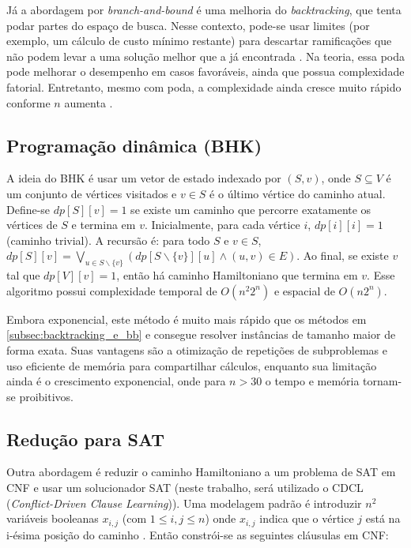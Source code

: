 Já a abordagem por \textit{branch-and-bound} é uma melhoria do \textit{backtracking}, que tenta podar partes do espaço de busca. Nesse contexto, pode-se usar limites (por exemplo, um cálculo de custo mínimo restante) para descartar ramificações que não podem levar a uma solução melhor que a já encontrada \cite{Sergeenko2020}. Na teoria, essa poda pode melhorar o desempenho em casos favoráveis, ainda que possua complexidade fatorial. Entretanto, mesmo com poda, a complexidade ainda cresce muito rápido conforme $n$ aumenta \cite{Sergeenko2020}.


\subsection{Programação dinâmica (BHK) \texorpdfstring{\cite{Held1962,Bellman1962}}{(Held e Karp, 1962; Bellman 1962)}} \label{subsec:programacao_dinamica}

A ideia do BHK é usar um vetor de estado indexado por $(S,v)$, onde $S\subseteq V$ é um conjunto de vértices visitados e $v\in S$ é o último vértice do caminho atual. Define-se $dp[S][v]=1$ se existe um caminho que percorre exatamente os vértices de $S$ e termina em $v$. Inicialmente, para cada vértice $i$, $dp[i][i]=1$ (caminho trivial). A recursão é: para todo $S$ e $v\in S$, $dp[S][v]=\bigvee_{u\in S\backslash\{v\}}(dp[S\backslash\{v\}][u]\land(u,v)\in E)$. Ao final, se existe $v$ tal que $dp[V][v]=1$, então há caminho Hamiltoniano que termina em $v$. Esse algoritmo possui complexidade temporal de $O(n^2 2^n)$ e espacial de $O(n2^n)$.

Embora exponencial, este método é muito mais rápido que os métodos em \ref{subsec:backtracking_e_bb} e consegue resolver instâncias de tamanho maior de forma exata. Suas vantagens são a otimização de repetições de subproblemas e uso eficiente de memória para compartilhar cálculos, enquanto sua limitação ainda é o crescimento exponencial, onde para $n>30$ o tempo e memória tornam-se proibitivos.


\subsection{Redução para SAT}

Outra abordagem é reduzir o caminho Hamiltoniano a um problema de SAT em CNF e usar um solucionador SAT (neste trabalho, será utilizado o CDCL (\textit{Conflict-Driven Clause Learning})). Uma modelagem padrão é introduzir $n^2$ variáveis booleanas $x_{i,j}$ (com $1\le i,j\le n$) onde $x_{i,j}$ indica que o vértice $j$ está na i-ésima posição do caminho \cite{Lyuu2022}. Então constrói-se as seguintes cláusulas em CNF:

